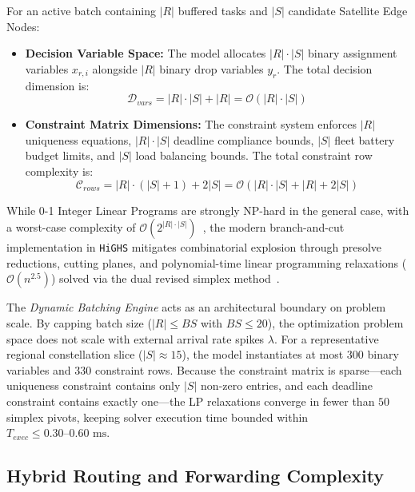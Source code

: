 For an active batch containing $|R|$ buffered tasks and $|S|$ candidate Satellite Edge Nodes:
\begin{itemize}
    \item \textbf{Decision Variable Space:} The model allocates $|R| \cdot |S|$ binary assignment variables $x_{r,i}$ alongside $|R|$ binary drop variables $y_r$. The total decision dimension is:
    \begin{equation}
        \mathcal{D}_{vars} = |R| \cdot |S| + |R| = \mathcal{O}(|R| \cdot |S|)
    \end{equation}
    \item \textbf{Constraint Matrix Dimensions:} The constraint system enforces $|R|$ uniqueness equations, $|R| \cdot |S|$ deadline compliance bounds, $|S|$ fleet battery budget limits, and $|S|$ load balancing bounds. The total constraint row complexity is:
    \begin{equation}
        \mathcal{C}_{rows} = |R| \cdot (|S| + 1) + 2|S| = \mathcal{O}(|R| \cdot |S| + |R| + 2|S|)
    \end{equation}
\end{itemize}

While 0-1 Integer Linear Programs are strongly NP-hard in the general case, with a worst-case complexity of $\mathcal{O}(2^{|R| \cdot |S|})$~\cite{wolsey1998integer}, the modern branch-and-cut implementation in \texttt{HiGHS} mitigates combinatorial explosion through presolve reductions, cutting planes, and polynomial-time linear programming relaxations ($\mathcal{O}(n^{2.5})$) solved via the dual revised simplex method~\cite{huangfu2018highs, wolsey1998integer}.

The \emph{Dynamic Batching Engine} acts as an architectural boundary on problem scale. 
By capping batch size ($|R| \le BS$ with $BS \le 20$), the optimization problem space does not scale with external arrival rate spikes $\lambda$. 
For a representative regional constellation slice ($|S| \approx 15$), the model instantiates at most $300$ binary variables and $330$ constraint rows. 
Because the constraint matrix is sparse—each uniqueness constraint contains only $|S|$ non-zero entries, and each deadline constraint contains exactly one—the LP relaxations converge in fewer than $50$ simplex pivots, keeping solver execution time bounded within $T_{exec} \le 0.30\text{--}0.60\text{ ms}$.

\subsection{Hybrid Routing and Forwarding Complexity}
\label{subsec:complexity_routing}

